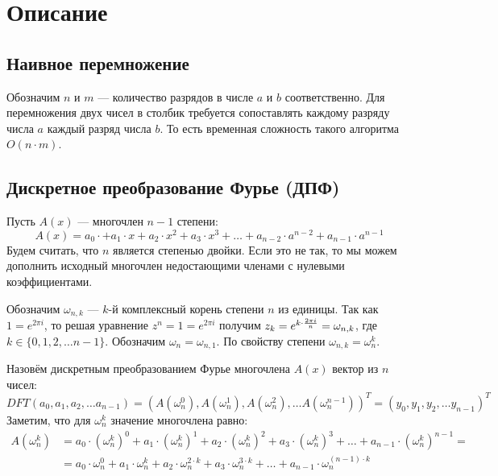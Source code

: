 \graphicspath{{png/}}

\section{Описание}

\subsection*{Наивное перемножение}

Обозначим $n$ и $m$ --- количество разрядов в числе $a$ и $b$ соответственно. Для перемножения двух чисел в столбик требуется сопоставлять каждому разряду числа $a$ каждый разряд числа $b$. То есть временная сложность такого алгоритма $O(n \cdot m)$.

\subsection*{Дискретное преобразование Фурье (ДПФ)}

Пусть $A(x)$ --- многочлен $n - 1$ степени:
$$A(x) = a_0 \cdot + a_1 \cdot x + a_2 \cdot x^2 + a_3 \cdot x^3 + \dots + a_{n - 2} \cdot a ^ {n - 2} + a_{n - 1} \cdot a ^ {n - 1}$$
Будем считать, что $n$ является степенью двойки. Если это не так, то мы можем дополнить исходный многочлен недостающими членами с нулевыми коэффициентами.

Обозначим $\omega_{n, k}$ --- $k$-й комплексный корень степени $n$ из единицы. Так как $1 = e ^ {2 \pi i}$, то решая уравнение $z ^ n = 1 = e ^ {2 \pi i}$ получим $z_k = e ^ {k \cdot {{2 \pi i} \over {n}}} = \omega_{n, k}$, где $k \in \{0, 1, 2, \dots n - 1 \}$. Обозначим $\omega_n = \omega_{n, 1}$. По свойству степени $\omega_{n, k} = \omega_n ^ k$.

Назовём дискретным преобразованием Фурье многочлена $A(x)$ вектор из $n$ чисел:
$$ DFT(a_0, a_1, a_2, \dots a_{n - 1}) = ( A(\omega_{n} ^ {0}), A(\omega_{n} ^ {1}), A(\omega_{n} ^ {2}), \dots A(\omega_{n} ^ {n - 1}) ) ^ T = (y_0, y_1, y_2, \dots y_{n - 1}) ^ T $$
Заметим, что для $\omega_{n} ^ {k}$ значение многочлена равно:
\begin{equation*}
    \begin{split}
        A(\omega_{n} ^ {k}) & = a_0 \cdot (\omega_{n} ^ {k}) ^ {0} + a_1 \cdot (\omega_{n} ^ {k}) ^ {1} + a_2 \cdot (\omega_{n} ^ {k}) ^ {2} + a_3 \cdot (\omega_{n} ^ {k}) ^ {3} + \dots + a_{n - 1} \cdot (\omega_{n} ^ {k}) ^ {n - 1} = \\
        & = a_0 \cdot \omega_{n} ^ {0} + a_1 \cdot \omega_{n} ^ {k} + a_2 \cdot \omega_{n} ^ {2 \cdot k} + a_3 \cdot \omega_{n} ^ {3 \cdot k} + \dots + a_{n - 1} \cdot \omega_{n} ^ {(n - 1) \cdot k}
    \end{split}
\end{equation*}

